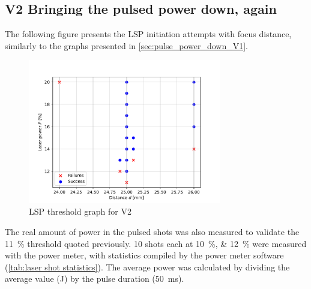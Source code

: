 

        \subsection{V2 Bringing the pulsed power down, again}
            
            The following figure presents the LSP initiation attempts with focus distance, similarly to the graphs presented in \autoref{sec:pulse_power_down_V1}.

            \begin{figure}[!ht]
                \centering
                \includegraphics[width=0.75\textwidth]{assets/4 experiments/V2_focus_threshold.pdf}
                \caption{LSP threshold graph for V2}
            \end{figure}

            The real amount of power in the pulsed shots was also measured to validate the \qty{11}{\%} threshold quoted previously. 10 shots each at \qtylist{10; 12}{\%} were measured with the power meter, with statistics compiled by the power meter software (\autoref{tab:laser shot statistics}). The average power was calculated by dividing the average value (J) by the pulse duration (\qty{50}{ms}).

